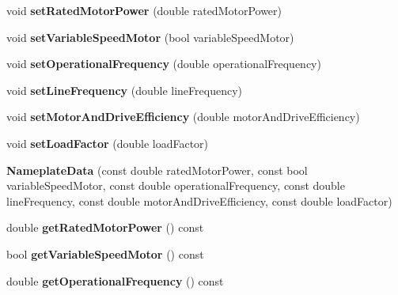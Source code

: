 \begin{DoxyCompactItemize}
void {\bfseries set\+Rated\+Motor\+Power} (double rated\+Motor\+Power)
\item 
\mbox{\label{class_nameplate_data_a684e1e8c9bf292a48facfd049ec0b312}} 
void {\bfseries set\+Variable\+Speed\+Motor} (bool variable\+Speed\+Motor)
\item 
\mbox{\label{class_nameplate_data_a462452ba8a3a49ffc711a97e9b75b66e}} 
void {\bfseries set\+Operational\+Frequency} (double operational\+Frequency)
\item 
\mbox{\label{class_nameplate_data_a44efac29acafa1d2598d20774807a54a}} 
void {\bfseries set\+Line\+Frequency} (double line\+Frequency)
\item 
\mbox{\label{class_nameplate_data_afbd08acd9803c61a7b6cc819ac20e65f}} 
void {\bfseries set\+Motor\+And\+Drive\+Efficiency} (double motor\+And\+Drive\+Efficiency)
\item 
\mbox{\label{class_nameplate_data_a069c14ca1d86d30261c041f8483ed924}} 
void {\bfseries set\+Load\+Factor} (double load\+Factor)
\item 
\mbox{\label{class_nameplate_data_a6958626d3d824cdffb7080c13f5bf1e6}} 
{\bfseries Nameplate\+Data} (const double rated\+Motor\+Power, const bool variable\+Speed\+Motor, const double operational\+Frequency, const double line\+Frequency, const double motor\+And\+Drive\+Efficiency, const double load\+Factor)
\item 
\mbox{\label{class_nameplate_data_a3506a38071eefa609103cd459c187423}} 
double {\bfseries get\+Rated\+Motor\+Power} () const
\item 
\mbox{\label{class_nameplate_data_abc4cb0dd430590e9d522bebb35613af2}} 
bool {\bfseries get\+Variable\+Speed\+Motor} () const
\item 
\mbox{\label{class_nameplate_data_a1cbccaaae346895abb0a95533b59d694}} 
double {\bfseries get\+Operational\+Frequency} () const
\item 
\mbox{\label{class_nameplate_data_af53b826d879b72f1108e60a49bab9174}} 

\end{DoxyCompactItemize}

